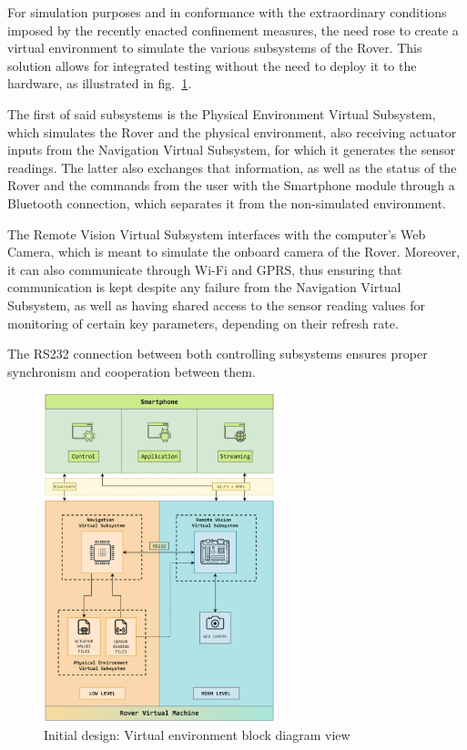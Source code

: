 For simulation purposes and in conformance with the extraordinary conditions imposed by the recently enacted confinement measures, the need rose to create a virtual environment to simulate the various subsystems of the Rover. This solution allows for integrated testing without the need to deploy it to the hardware, as illustrated in fig.~\ref{fig:initial-design-2}.

The first of said subsystems is the Physical Environment Virtual Subsystem, which simulates the Rover and the physical environment, also receiving actuator inputs from the Navigation Virtual Subsystem, for which it generates the sensor readings. The latter also exchanges that information, as well as the status of the Rover and the commands from the user with the Smartphone module through a Bluetooth connection, which separates it from the non-simulated environment.

The Remote Vision Virtual Subsystem interfaces with the computer's Web Camera, which is meant to simulate the onboard camera of the Rover. Moreover, it can also communicate through Wi-Fi and GPRS, thus ensuring that communication is kept despite any failure from the Navigation Virtual Subsystem, as well as having shared access to the sensor reading values for monitoring of certain key parameters, depending on their refresh rate.

The RS232 connection between both controlling subsystems ensures proper synchronism and cooperation between them.
\newpage
\begin{figure}[!ht]
\centering
\includegraphics[width=0.6\textwidth]{./sec/img/initial_design_diagram_2.png}
\caption{\label{fig:initial-design-2}Initial design: Virtual environment block diagram view}
\end{figure}

